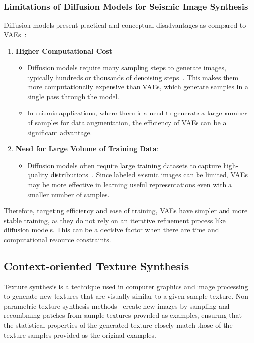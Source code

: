 \documentclass{ieeeaccess}
\begin{document}
\subsubsection{Limitations of Diffusion Models for Seismic Image Synthesis}
Diffusion models present practical and conceptual disadvantages as compared to VAEs~\cite{Zhou2024}:
\begin{enumerate}
    \item \textbf{Higher Computational Cost}:
    \begin{itemize}
        \item Diffusion models require many sampling steps to generate images, typically hundreds or thousands of denoising steps~\cite{Zhou2024}. This makes them more computationally expensive than VAEs, which generate samples in a single pass through the model.
        \item In seismic applications, where there is a need to generate a large number of samples for data augmentation, the efficiency of VAEs can be a significant advantage. 
    \end{itemize}
    \item \textbf{Need for Large Volume of Training Data}:
    \begin{itemize}
        \item Diffusion models often require large training datasets to capture high-quality distributions~\cite{Zhou2024}. Since labeled seismic images can be limited, VAEs may be more effective in learning useful representations even with a smaller number of samples.
    \end{itemize}
\end{enumerate}

Therefore, targeting efficiency and ease of training, VAEs have simpler and more stable training, as they do not rely on an iterative refinement process like diffusion models. This can be a decisive factor when there are time and computational resource constraints.


\subsection{Context-oriented Texture Synthesis}

Texture synthesis is a technique used in computer graphics and image processing to generate new textures that are visually similar to a given sample texture. Non-parametric texture synthesis methods~\cite{Efros1999} create new images by sampling and recombining patches from sample textures provided as examples, ensuring that the statistical properties of the generated texture closely match those of the texture samples provided as the original  examples.
\end{document}
